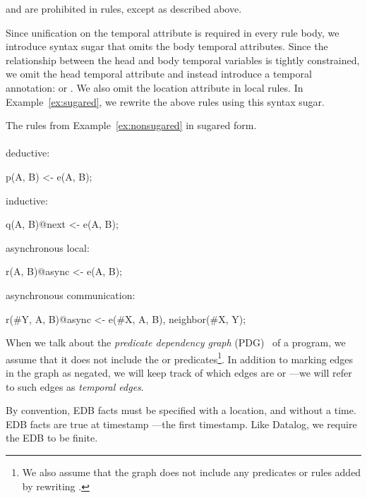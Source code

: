  and  are prohibited in rules, except as described above.

Since unification on the temporal attribute is required in every rule body,
we introduce syntax sugar that omits the body temporal attributes.  Since the relationship between the head and body temporal variables is tightly constrained, we omit the head temporal attribute and instead introduce a temporal annotation:  or .  We also omit the location attribute in local rules.  In Example~\ref{ex:sugared}, we rewrite the above rules using this syntax sugar.

\begin{example}
\label{ex:sugared}
The rules from Example~\ref{ex:nonsugared} in sugared form.
\\\\
deductive:\\
\begin{Dedalus}
p(A, B) <- e(A, B);
\end{Dedalus}
inductive:\\
\begin{Dedalus}
q(A, B)@next <- e(A, B);
\end{Dedalus}
asynchronous local:\\
\begin{Dedalus}
r(A, B)@async <- e(A, B);
\end{Dedalus}
asynchronous communication:\\
\begin{Dedalus}
r(#Y, A, B)@async <- e(#X, A, B), neighbor(#X, Y);
\end{Dedalus}
\end{example}

When we talk about the {\em predicate dependency graph} (PDG)~\cite{ullmanbook} of a \lang program, we assume that it does not include the  or  predicates\footnote{We also assume that the graph does not include any predicates or rules added by rewriting .}.  In addition to marking edges in the graph as negated, we will keep track of which edges are  or ---we will refer to such edges as {\em temporal edges}.


\vspace{1em}
By convention, EDB facts must be specified with a location, and without a time.  EDB facts are true at timestamp ---the first timestamp.  Like Datalog, we require the EDB to be finite.

